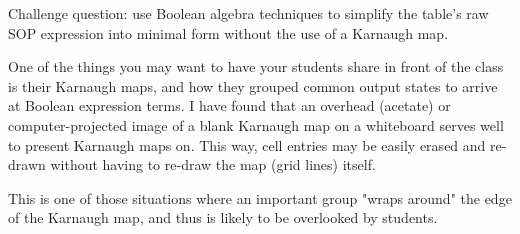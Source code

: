 \vskip 10pt

Challenge question: use Boolean algebra techniques to simplify the table's raw SOP expression into minimal form without the use of a Karnaugh map.







One of the things you may want to have your students share in front of the class is their Karnaugh maps, and how they grouped common output states to arrive at Boolean expression terms.  I have found that an overhead (acetate) or computer-projected image of a blank Karnaugh map on a whiteboard serves well to present Karnaugh maps on.  This way, cell entries may be easily erased and re-drawn without having to re-draw the map (grid lines) itself.

This is one of those situations where an important group "wraps around" the edge of the Karnaugh map, and thus is likely to be overlooked by students.




